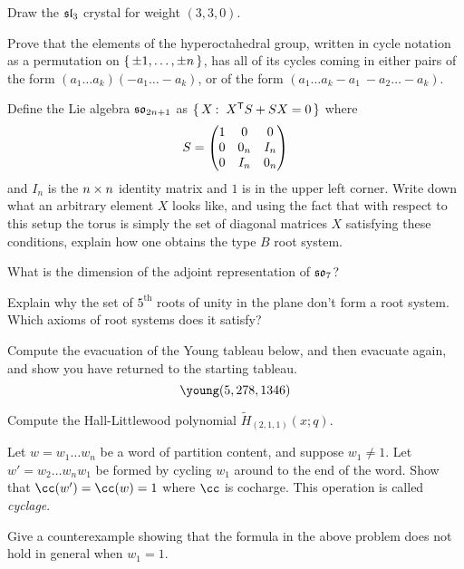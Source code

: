 \documentclass[12pt]{memoir}
\begin{document}
\begin{Ej}
Draw the $\mathfrak{sl}_3$ crystal for weight $(3,3,0)$.
\end{Ej}

\begin{Ej}
    Prove that the elements of the hyperoctahedral group, written in cycle notation as a permutation on $\{\,\pm1,\dots , \pm n\,\}$, has all of its cycles coming in either pairs of the form $(a_1\dots a_k)(-a_1\dots -a_k)$, or of the form $(a_1\dots a_k -a_1\ -a_2\dots-a_k)$.
\end{Ej}

\begin{Ej}
    Define the Lie algebra $\mathfrak{so}_{2n+1}$ as $\{\,X\mathbin{:}\ X^{\mathsf{T}} S+SX=0\,\}$ where 
    $$S=\begin{pmatrix} 1 & 0 & 0 \\ 0 & 0_n & I_n \\ 0 & I_n & 0_n \end{pmatrix}$$
    and $I_n$ is the $n\times n$ identity matrix and $1$ is in the upper left corner. Write down what an arbitrary element $X$ looks like, and using the fact that with respect to this setup the torus is simply the set of diagonal matrices $X$ satisfying these conditions, explain how one obtains the type $B$ root system.
\end{Ej}

\begin{Ej}
    What is the dimension of the adjoint representation of $\mathfrak{so}_7$?
\end{Ej}

\begin{Ej}
    Explain why the set of $5^{\text{th}}$ roots of unity in the plane don't form a root system. Which axioms of root systems does it satisfy?
\end{Ej}

\begin{Ej}
    Compute the evacuation of the Young tableau below, and then evacuate again, and show you have returned to the starting tableau.
    $$\young(5,278,1346)$$
\end{Ej}

\begin{Ej}
    Compute the Hall-Littlewood polynomial $\tilde{H}_{(2,1,1)}(x;q)$.
\end{Ej}

\begin{Ej}
    Let $w=w_1\dots w_n$ be a word of partition content, and suppose $w_1\neq 1$. Let $w'=w_2\dots w_nw_1$ be formed by cycling $w_1$ around to the end of the word. Show that $\cc(w')=\cc(w)=1$ where $\cc$ is cocharge. This operation is called \emph{cyclage}.
\end{Ej}

\begin{Ej}
    Give a counterexample showing that the formula in the above problem does not hold in general when $w_1=1$.
\end{Ej}
\end{document}

